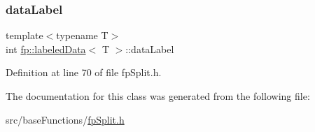 \subsubsection{\texorpdfstring{data\+Label}{dataLabel}}
{\footnotesize\ttfamily template$<$typename T$>$ \\
int \hyperlink{classfp_1_1labeledData}{fp\+::labeled\+Data}$<$ T $>$\+::data\+Label\hspace{0.3cm}{\ttfamily [protected]}}



Definition at line 70 of file fp\+Split.\+h.



The documentation for this class was generated from the following file\+:\begin{DoxyCompactItemize}
\item 
src/base\+Functions/\hyperlink{fpSplit_8h}{fp\+Split.\+h}\end{DoxyCompactItemize}
